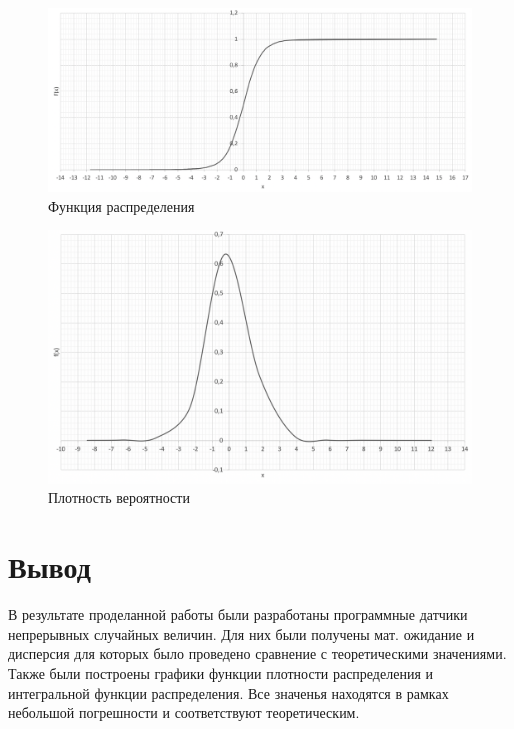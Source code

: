\documentclass{article}
\begin{document}
		\begin{figure}[!htb]
		    \includegraphics[scale = 0.35]{student/2.png}
    		\caption{Функция распределения}
		\end{figure}
		 	 	
		\begin{figure}[!htb]
			\includegraphics[scale = 0.38]{student/3.png}
			\caption{Плотность вероятности}
   		\end{figure}
   	\newpage

   	\section{Вывод}
		В результате проделанной работы были разработаны программные датчики непрерывных случайных величин. Для них были 
		получены мат. ожидание и дисперсия для которых было проведено сравнение с теоретическими значениями. Также были 
		построены графики функции плотности распределения и интегральной функции распределения.	
		Все значенья находятся в рамках небольшой погрешности и соответствуют теоретическим.
	\newpage
	
\end{document}
